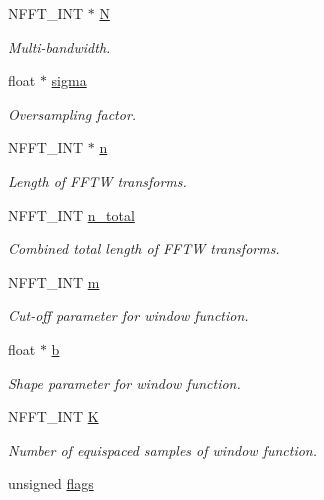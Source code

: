 \begin{DoxyCompactItemize}
N\-F\-F\-T\-\_\-\-I\-N\-T $\ast$ \hyperlink{structnfftf__plan_a2cbc0f46a4f12f077dd82d6e78bf8e6f}{N}
\begin{DoxyCompactList}\small\item\em Multi-\/bandwidth. \end{DoxyCompactList}\item 
float $\ast$ \hyperlink{structnfftf__plan_a20d669812b6acf9a8bda34cb659d61dd}{sigma}
\begin{DoxyCompactList}\small\item\em Oversampling factor. \end{DoxyCompactList}\item 
N\-F\-F\-T\-\_\-\-I\-N\-T $\ast$ \hyperlink{structnfftf__plan_af3d8b5fb6da6564641c613016218c11a}{n}
\begin{DoxyCompactList}\small\item\em Length of F\-F\-T\-W transforms. \end{DoxyCompactList}\item 
N\-F\-F\-T\-\_\-\-I\-N\-T \hyperlink{structnfftf__plan_a4a8cde81c6ece514d2b36b46aa998842}{n\-\_\-total}
\begin{DoxyCompactList}\small\item\em Combined total length of F\-F\-T\-W transforms. \end{DoxyCompactList}\item 
N\-F\-F\-T\-\_\-\-I\-N\-T \hyperlink{structnfftf__plan_a693155aad31ca629ab9ba72815e1441c}{m}
\begin{DoxyCompactList}\small\item\em Cut-\/off parameter for window function. \end{DoxyCompactList}\item 
\hypertarget{structnfftf__plan_a3ede2fe9c94e00ec59150ba2971facb2}{float $\ast$ \hyperlink{structnfftf__plan_a3ede2fe9c94e00ec59150ba2971facb2}{b}}\label{structnfftf__plan_a3ede2fe9c94e00ec59150ba2971facb2}

\begin{DoxyCompactList}\small\item\em Shape parameter for window function. \end{DoxyCompactList}\item 
N\-F\-F\-T\-\_\-\-I\-N\-T \hyperlink{structnfftf__plan_ac66468ce54f091334ae0baffe42135a5}{K}
\begin{DoxyCompactList}\small\item\em Number of equispaced samples of window function. \end{DoxyCompactList}\item 
\hypertarget{structnfftf__plan_a702d15b0a709dc06ceffd8dde73b3e69}{unsigned \hyperlink{structnfftf__plan_a702d15b0a709dc06ceffd8dde73b3e69}{flags}}\label{structnfftf__plan_a702d15b0a709dc06ceffd8dde73b3e69}


\end{DoxyCompactItemize}
